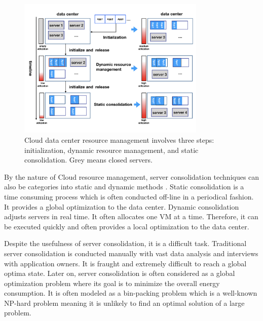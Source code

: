\begin{figure}
	\centering
	\includegraphics[width=0.8\textwidth]{pics/resource_management.png}
	\caption{Cloud data center resource management involves three steps: initialization, dynamic resource management, and static consolidation. Grey means closed servers.}
	\label{fig:management}
\end{figure} 


By the nature of Cloud resource management, server consolidation techniques can also be categories into static and dynamic methods \cite{Xiao:2015ik, Verma:2009wi}. Static consolidation is a time consuming process which is often conducted off-line in a periodical fashion. It provides a global optimization to the data center. Dynamic consolidation adjusts servers in real time. It often allocates one VM at a time. Therefore, it can be executed quickly and often provides a local optimization to the data center.

\vspace{10mm}

Despite the usefulness of server consolidation, it is a difficult task. Traditional server consolidation is conducted manually \cite{Chebiyyam:2009uq} with vast data analysis and interviews with application owners. It is fraught and extremely difficult to reach a global optima state.
Later on, server consolidation is often considered as a global optimization problem 
where its goal is to minimize the overall energy consumption. 
It is often modeled as a bin-packing problem \cite{Mann:2015ua} which is a well-known NP-hard problem meaning it is unlikely to find an optimal solution of a large problem. 

